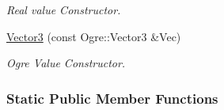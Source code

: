 \begin{DoxyCompactItemize}
\begin{DoxyCompactList}\small\item\em Real value Constructor. \item\end{DoxyCompactList}\item 
\hyperlink{classMezzanine_1_1Vector3_a1044f4ea5fd3bddc6afb49209a14f4b9}{Vector3} (const Ogre::Vector3 \&Vec)
\begin{DoxyCompactList}\small\item\em Ogre Value Constructor. \item\end{DoxyCompactList}\end{DoxyCompactItemize}
\subsubsection*{Static Public Member Functions}

